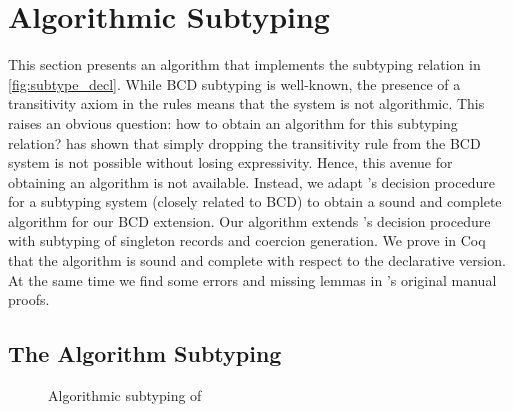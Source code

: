 
\section{Algorithmic Subtyping}
\label{sec:alg}

This section presents an algorithm that implements the subtyping relation in
\cref{fig:subtype_decl}. While BCD subtyping is well-known, the
presence of a transitivity axiom in the rules means that the system is
not algorithmic. This raises an obvious question: how to obtain an
algorithm for this subtyping relation? \citet{Laurent12note} has shown that simply dropping
the transitivity rule from the BCD system is not possible without losing expressivity. Hence, this avenue for
obtaining an algorithm is not available. 
Instead, we adapt \citeauthor{pierce1989decision}'s decision
procedure~\citep{pierce1989decision} for a subtyping system (closely
related to BCD) to obtain a sound and complete algorithm for our
BCD extension. Our algorithm extends \citeauthor{pierce1989decision}'s decision
procedure with subtyping of singleton records and
coercion generation. We prove in Coq that the algorithm is sound and complete with
respect to the declarative version. At the same time we
find some errors and missing lemmas in \citeauthor{pierce1989decision}'s original manual proofs.




\subsection{The Algorithm Subtyping}

\begin{figure}[t]
  \centering
  \caption{Algorithmic subtyping of \name}
  \label{fig:algorithm}
\end{figure}


